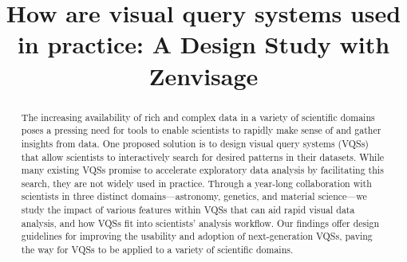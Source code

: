 \documentclass[sigchi]{acmart}
\begin{document}
\title{How are visual query systems used in practice: A Design Study with Zenvisage}

\begin{abstract}
The increasing availability of rich and complex data in a variety of scientific domains poses a pressing need for tools to enable scientists to rapidly make sense of and gather insights from data. One proposed solution is to design visual query systems (VQSs) that allow scientists to interactively search for desired patterns in their datasets. While many existing VQSs promise to accelerate exploratory data analysis by facilitating this search, they are not widely used in practice. Through a year-long collaboration with scientists in three distinct domains---astronomy, genetics, and material science---we study the impact of various features within VQSs that can aid rapid visual data analysis, and how VQSs fit into scientists' analysis workflow. Our findings offer design guidelines for improving the usability and adoption of next-generation VQSs, paving the way for VQSs to be applied to a variety of scientific domains.
\end{abstract}
\maketitle






% 


\end{document}
